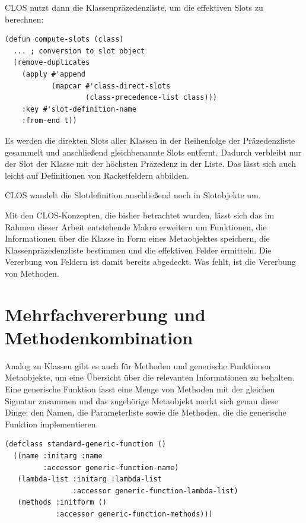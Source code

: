 CLOS nutzt dann die Klassenpräzedenzliste, um die effektiven Slots zu berechnen:

\begin{lstlisting}
(defun compute-slots (class)
  ... ; conversion to slot object
  (remove-duplicates
    (apply #'append 
           (mapcar #'class-direct-slots
                   (class-precedence-list class)))
    :key #'slot-definition-name
    :from-end t))
\end{lstlisting}

Es werden die direkten Slots aller Klassen in der Reihenfolge der Präzedenzliste gesammelt und anschließend gleichbenannte Slots entfernt. Dadurch verbleibt nur der Slot der Klasse mit der höchsten Präzedenz in der Liste. Das lässt sich auch leicht auf Definitionen von Racketfeldern abbilden.

CLOS wandelt die Slotdefinition anschließend noch in Slotobjekte um. %

Mit den CLOS-Konzepten, die bisher betrachtet wurden, lässt sich das im Rahmen dieser Arbeit entstehende Makro erweitern um Funktionen, die Informationen über die Klasse in Form eines Metaobjektes speichern, die Klassenpräzedenzliste bestimmen und  die effektiven Felder ermitteln. Die Vererbung von Feldern ist damit bereits abgedeckt. Was fehlt, ist die Vererbung von Methoden.

\section{Mehrfachvererbung und Methodenkombination}
Analog zu Klassen gibt es auch für Methoden und generische Funktionen Metaobjekte, um eine Übersicht über die relevanten Informationen zu behalten. Eine generische Funktion fasst eine Menge von Methoden mit der gleichen Signatur zusammen und das zugehörige Metaobjekt merkt sich genau diese Dinge: den Namen, die Parameterliste sowie die Methoden, die die generische Funktion implementieren.

\begin{lstlisting}
(defclass standard-generic-function ()
  ((name :initarg :name
         :accessor generic-function-name)
   (lambda-list :initarg :lambda-list
                :accessor generic-function-lambda-list)
   (methods :initform ()
            :accessor generic-function-methods)))
\end{lstlisting}

